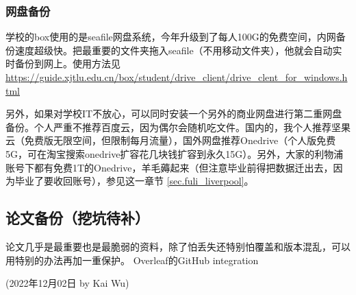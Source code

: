 \subsubsection{网盘备份}

学校的box使用的是seafile网盘系统，今年升级到了每人100G的免费空间，内网备份速度超级快。把最重要的文件夹拖入seafile（不用移动文件夹），他就会自动实时备份到网上。使用方法见\url{https://guide.xjtlu.edu.cn/box/student/drive_client/drive_clent_for_windows.html}

另外，如果对学校IT不放心，可以同时安装一个另外的商业网盘进行第二重网盘备份。个人严重不推荐百度云，因为偶尔会随机吃文件。国内的，我个人推荐坚果云（免费版无限空间，但限制每月流量），国外网盘推荐Onedrive（个人版免费5G，可在淘宝搜索onedrive扩容花几块钱扩容到永久15G）。另外，大家的利物浦账号下都有免费1T的Onedrive，羊毛薅起来（但注意毕业前得把数据迁出去，因为毕业了要收回账号），参见这一章节 \ref{sec.fuli_liverpool}。


\subsection{论文备份（挖坑待补）}
论文几乎是最重要也是最脆弱的资料，除了怕丢失还特别怕覆盖和版本混乱，可以用特别的办法再加一重保护。
Overleaf的GitHub integration


\begin{flushright}
(2022年12月02日 by Kai Wu)
\end{flushright}





% 
